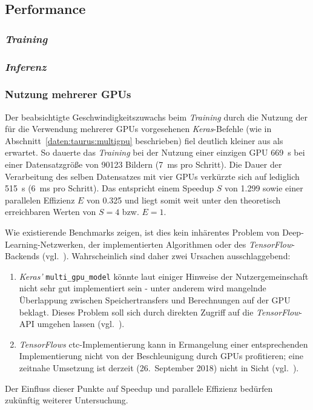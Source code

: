 \subsection{Performance}

\subsubsection{\textit{Training}}

\subsubsection{\textit{Inferenz}}

\subsubsection{Nutzung mehrerer GPUs}

Der beabsichtigte Geschwindigkeitszuwachs beim \textit{Training} durch die Nutzung der für die Verwendung mehrerer GPUs
vorgesehenen \textit{Keras}-Befehle (wie in Abschnitt~\ref{daten:taurus:multigpu} beschrieben) fiel deutlich kleiner aus
als erwartet. So dauerte das \textit{Training} bei der Nutzung einer einzigen GPU \SI{669}{\second} bei einer
Datensatzgröße von 90123 Bildern (\SI{7}{\milli\second} pro Schritt). Die Dauer der Verarbeitung des selben Datensatzes
mit vier GPUs verkürzte sich auf lediglich \SI{515}{\second} (\SI{6}{\milli\second} pro Schritt). Das entspricht einem
Speedup $S$ von \num{1,299} sowie einer parallelen Effizienz $E$ von \num{0,325} und liegt somit weit unter den
theoretisch erreichbaren Werten von $S = 4$ bzw. $E = 1$.

Wie existierende Benchmarks zeigen, ist dies kein inhärentes Problem von Deep-Learning-Netzwerken, der implementierten
Algorithmen oder des \textit{TensorFlow}-Backends (vgl.~\cite{tensorflowbench}). Wahrscheinlich sind daher zwei
Ursachen ausschlaggebend:

\begin{enumerate}
    \item \textit{Keras'} \texttt{multi\_gpu\_model} könnte laut einiger Hinweise der Nutzergemeinschaft nicht sehr gut
          implementiert sein - unter anderem wird mangelnde Überlappung zwischen Speichertransfers und Berechnungen auf
          der GPU beklagt. Dieses Problem soll sich durch direkten Zugriff auf die \textit{TensorFlow}-API umgehen
          lassen (vgl.~\cite{zamecnik2017}).
    \item \textit{TensorFlows} \gls{ctc}-Implementierung kann in Ermangelung einer entsprechenden Implementierung nicht
          von der Beschleunigung durch GPUs profitieren; eine zeitnahe Umsetzung ist derzeit (26.\ September 2018) nicht
          in Sicht (vgl.~\cite{hibbert2016}).
\end{enumerate}

Der Einfluss dieser Punkte auf Speedup und parallele Effizienz bedürfen zukünftig weiterer Untersuchung.
